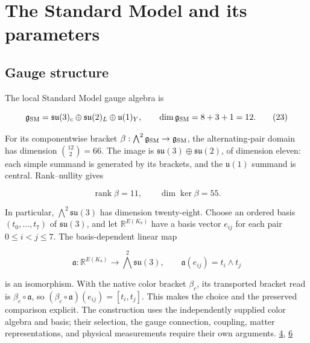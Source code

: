 \hypertarget{the-standard-model-and-its-parameters}{%
\section{The Standard Model and its parameters}\label{the-standard-model-and-its-parameters}}

\hypertarget{gauge-structure}{%
\subsection{Gauge structure}\label{gauge-structure}}

The local Standard Model gauge algebra is

\[
\mathfrak g_{\rm SM}
=\mathfrak{su}(3)_c\oplus\mathfrak{su}(2)_L\oplus\mathfrak u(1)_Y,
\qquad
\dim\mathfrak g_{\rm SM}=8+3+1=12.
\tag{23}
\]

For its componentwise bracket \(\beta:\bigwedge^2\mathfrak g_{\rm SM}\to\mathfrak g_{\rm SM}\), the alternating-pair domain has dimension \(\binom{12}{2}=66\). The image is \(\mathfrak{su}(3)\oplus\mathfrak{su}(2)\), of dimension eleven: each simple summand is generated by its brackets, and the \(\mathfrak u(1)\) summand is central. Rank--nullity gives

\[
\operatorname{rank}\beta=11,
\qquad
\dim\ker\beta=55.
\tag{24}
\]

In particular, \(\bigwedge^2\mathfrak{su}(3)\) has dimension twenty-eight. Choose an ordered basis \((t_0,\ldots,t_7)\) of \(\mathfrak{su}(3)\), and let \(\mathbb R^{E(K_8)}\) have a basis vector \(e_{ij}\) for each pair \(0\le i<j\le7\). The basis-dependent linear map

\[
\mathfrak a:\mathbb R^{E(K_8)}\longrightarrow\bigwedge^2\mathfrak{su}(3),
\qquad \mathfrak a(e_{ij})=t_i\wedge t_j
\tag{24a}
\]

is an isomorphism. With the native color bracket \(\beta_c\), its transported bracket read is \(\beta_c\circ\mathfrak a\), so \((\beta_c\circ\mathfrak a)(e_{ij})=[t_i,t_j]\). This makes the choice and the preserved comparison explicit. The construction uses the independently supplied color algebra and basis; their selection, the gauge connection, coupling, matter representations, and physical measurements require their own arguments. \href{https://github.com/Coppalini-Architecture/coppalini-architecture/blob/9b7122ca5c3712c2c294e2bc5097276d0ba9817b/papers/motion-and-difference/motion-and-difference-2026-07-17.pdf}{4}, \href{https://chatgpt.com/library?file_id=libfile_5aa28715b83881919460603dea30bc25\&account_id=personal}{6}

